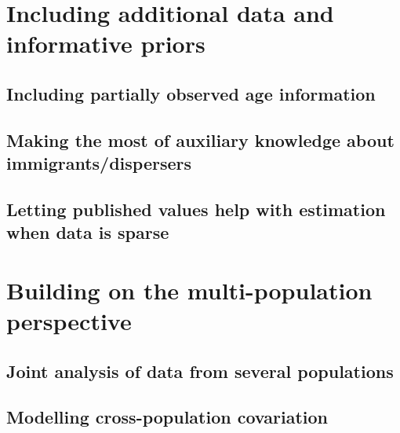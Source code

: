 \documentclass[
]{book}
\begin{document}
\hypertarget{including-additional-data-and-informative-priors}{%
\section{Including additional data and informative priors}\label{including-additional-data-and-informative-priors}}

\hypertarget{including-partially-observed-age-information}{%
\subsection{Including partially observed age information}\label{including-partially-observed-age-information}}

\hypertarget{making-the-most-of-auxiliary-knowledge-about-immigrantsdispersers}{%
\subsection{Making the most of auxiliary knowledge about immigrants/dispersers}\label{making-the-most-of-auxiliary-knowledge-about-immigrantsdispersers}}

\hypertarget{letting-published-values-help-with-estimation-when-data-is-sparse}{%
\subsection{Letting published values help with estimation when data is sparse}\label{letting-published-values-help-with-estimation-when-data-is-sparse}}

\hypertarget{building-on-the-multi-population-perspective}{%
\section{Building on the multi-population perspective}\label{building-on-the-multi-population-perspective}}

\hypertarget{joint-analysis-of-data-from-several-populations}{%
\subsection{Joint analysis of data from several populations}\label{joint-analysis-of-data-from-several-populations}}

\hypertarget{modelling-cross-population-covariation}{%
\subsection{Modelling cross-population covariation}\label{modelling-cross-population-covariation}}
\end{document}
